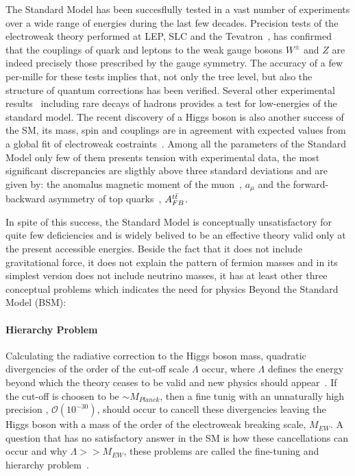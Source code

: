 The Standard Model has been succesflully tested in a vast number of experiments over a wide range of energies during the last few decades.
Precision tests of the electroweak theory performed at LEP, SLC and the Tevatron~\cite{smtest}, 
has confirmed that the couplings of quark and leptons to the weak gauge bosons $W^{\pm}$  and $Z$ are indeed
precisely those prescribed by the gauge symmetry. The accuracy of a few per-mille for these
tests implies that, not only the tree level, but also the structure of quantum corrections has
been verified. Several other experimental results~\cite{pdg}
including rare decays of hadrons provides a test for low-energies of the standard model. 
The recent discovery of a Higgs boson  is also another success of the SM, its mass, spin and couplings 
are in agreement with expected values from a global fit of electroweak costraints~\cite{gfitter}.
Among all the parameters of the Standard Model only few of them presents tension with experimental data, 
the most significant discrepancies are sligthly above three standard deviations and are given by: the anomalus magnetic moment 
of the muon~\cite{gminus2}, $a_{\mu}$  and the forward-backward asymmetry of top quarks~\cite{FBasymmetry}, $A_{FB}^{t\bar{t}}$.   


In spite of this success, the Standard Model is conceptually unsatisfactory for quite few deficiencies and is
widely belived to be an effective theory valid only at the present accessible energies. Beside the fact that 
it does not  include  gravitational force, it does not explain the pattern of fermion masses and in its simplest 
version does not include neutrino masses, it has at least other three conceptual problems which indicates the need 
for physics Beyond the Standard Model (BSM):
\paragraph{Hierarchy Problem} Calculating the radiative correction to the Higgs boson mass, quadratic divergencies of the order  
	of the cut-off scale $\Lambda$ occur, where  $\Lambda$ defines  the energy
	beyond which the theory ceases to be valid and new physics should appear~\cite{Lambda}. If the cut-off is choosen 
	to be $\sim M_{Planck}$, then a fine tunig  with an unnaturally high precision , $\mathcal{O}(10^{-30})$, should occur to cancell these divergencies 
	leaving the Higgs boson with a mass of the order of the electroweak breaking scale, $M_{EW}$.
	A question that has no satisfactory answer in the SM is how these cancellations can occur and why $\Lambda >> M_{EW}$, these problems are
	called the fine-tuning and hierarchy problem~\cite{Hierarchy1,Hierarchy2,Hierarchy3}.

